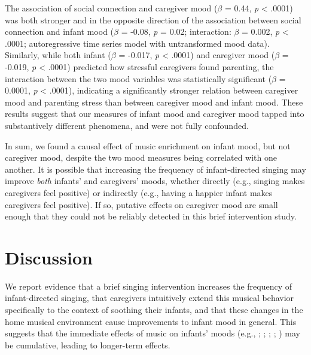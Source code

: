 \documentclass[
]{article}
\begin{document}
The association of social connection and caregiver mood (\(\beta\) =
0.44, \emph{p} \textless{} .0001) was both stronger and in the opposite
direction of the association between social connection and infant mood
(\(\beta\) = -0.08, \emph{p} = 0.02; interaction: \(\beta\) = 0.002,
\emph{p} \textless{} .0001; autoregressive time series model with
untransformed mood data). Similarly, while both infant (\(\beta\) =
-0.017, \emph{p} \textless{} .0001) and caregiver mood (\(\beta\) =
-0.019, \emph{p} \textless{} .0001) predicted how stressful caregivers
found parenting, the interaction between the two mood variables was
statistically significant (\(\beta\) = 0.0001, \emph{p} \textless{}
.0001), indicating a significantly stronger relation between caregiver
mood and parenting stress than between caregiver mood and infant mood.
These results suggest that our measures of infant mood and caregiver
mood tapped into substantively different phenomena, and were not fully
confounded.

In sum, we found a causal effect of music enrichment on infant mood, but
not caregiver mood, despite the two mood measures being correlated with
one another. It is possible that increasing the frequency of
infant-directed singing may improve \emph{both} infants' and caregivers'
moods, whether directly (e.g., singing makes caregivers feel positive)
or indirectly (e.g., having a happier infant makes caregivers feel
positive). If so, putative effects on caregiver mood are small enough
that they could not be reliably detected in this brief intervention
study.

\section{Discussion}\label{discussion}

We report evidence that a brief singing intervention increases the
frequency of infant-directed singing, that caregivers intuitively extend
this musical behavior specifically to the context of soothing their
infants, and that these changes in the home musical environment cause
improvements to infant mood in general. This suggests that the immediate
effects of music on infants' moods (e.g.,
;
;
;
;
) may be cumulative,
leading to longer-term effects.
\end{document}
